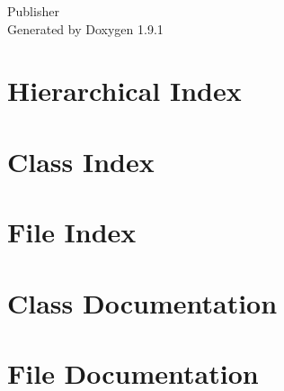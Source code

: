 \let\mypdfximage\pdfximage\def\pdfximage{\immediate\mypdfximage}\documentclass[twoside]{book}
\newcommand{\+}{\discretionary{\mbox{\scriptsize$\hookleftarrow$}}{}{}}
\newcommand{\clearemptydoublepage}{%
  \newpage{\pagestyle{empty}\cleardoublepage}%
}
\begin{document}
\raggedbottom

\hypersetup{pageanchor=false,
             bookmarksnumbered=true,
             pdfencoding=unicode
            }
\begin{titlepage}
\vspace*{7cm}
\begin{center}%
{\Large Publisher }\\
\vspace*{1cm}
{\large Generated by Doxygen 1.9.1}\\
\end{center}
\end{titlepage}
\clearemptydoublepage
{}
\tableofcontents
\clearemptydoublepage
{}
\hypersetup{pageanchor=true}

\chapter{Hierarchical Index}

\chapter{Class Index}

\chapter{File Index}

\chapter{Class Documentation}
















\chapter{File Documentation}


\backmatter
\newpage
{}
\clearemptydoublepage
{}
\printindex
\end{document}
